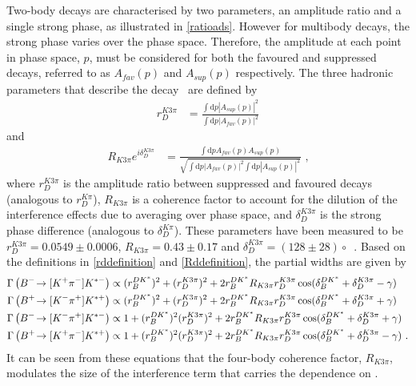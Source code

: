 Two-body \decay{\D}{\Kmp\pipm} decays are characterised by two parameters, an amplitude ratio and a single strong phase, as illustrated in \eqn\ref{ratioads}. However for multibody \decay{\D}{\Kmp\pipm\pimp\pipm} decays, the strong phase varies over the phase space. Therefore, the amplitude at each point in phase space, $p$, must be considered for both the \decay{\Dz}{\Km\pip\pim\pip} favoured and \decay{\Dz}{\Kp\pim\pip\pim} suppressed decays, referred to as $A_{fav}(p)$ and $A_{sup}(p)$ respectively. The three hadronic parameters that describe the \decay{\D}{\Km\pip\pim\pip} decay~\cite{charmk3pi,charmk3pi_errata,LHCb-PAPER-2015-057} are defined by
\begin{align}
r_D^{K3\pi} &= \frac{\int \mathrm{d}p \left|A_{sup}(p)\right|^2}{\int \mathrm{d}p \left|A_{fav}(p)\right|^2}
\label{rddefinition}
\end{align}
and
\begin{align}
R_{K3\pi} e^{i\delta_D^{K3\pi}} &= \frac{\int \mathrm{d}p A_{fav}(p)A_{sup}(p)}{\sqrt{\int \mathrm{d}p \left|A_{fav}(p)\right|^2 \int \mathrm{d}p \left|A_{sup}(p)\right|^2}} \text { ,}
\label{Rddefinition}
\end{align}
where $r_D^{K3\pi}$ is the amplitude ratio between suppressed and favoured \decay{\D}{\Km\pip\pim\pip} decays (analogous to $r_D^{K\pi}$), $R_{K3\pi}$ is a coherence factor to account for the dilution of the interference effects due to averaging over phase space, and $\delta_D^{K3\pi}$ is the strong phase difference (analogous to $\delta_D^{K\pi}$). These parameters have been measured to be $r_D^{K3\pi} = 0.0549 \pm 0.0006$, $R_{K3\pi} = 0.43 \pm 0.17$ and $\delta_D^{K3\pi} = \left(128 \pm 28\right){\circ}$~\cite{charmk3pi,charmk3pi_errata,LHCb-PAPER-2015-057}. Based on the definitions in \eqns\ref{rddefinition} and \ref{Rddefinition}, the partial widths are given by
\begin{align}
\Gamma\left({{{B}^-}}\!\rightarrow [{{K}^+}{{\pi}^-}]{\ensuremath{{K}^{*-}}}\right) &\propto (r_B^{DK^*})^2 + (r_D^{K3\pi})^2 + 2r_B^{DK^*}R_{K3\pi}r_D^{K3\pi}\cos(\delta_B^{DK^*} + \delta_D^{K3\pi} - \gamma) \label{adsBdecaym4body} \\
\Gamma\left({{{B}^+}}\!\rightarrow [{{K}^-}{{\pi}^+}]{\ensuremath{{K}^{*+}}}\right) &\propto (r_B^{DK^*})^2 + (r_D^{K3\pi})^2 + 2r_B^{DK^*}R_{K3\pi}r_D^{K3\pi}\cos(\delta_B^{DK^*} + \delta_D^{K3\pi} + \gamma) \label{adsBdecayp4body} \\
\Gamma\left({{{B}^-}}\!\rightarrow [{{K}^-}{{\pi}^+}]{\ensuremath{{K}^{*-}}}\right) &\propto 1 + (r_B^{DK^*})^2(r_D^{K3\pi})^2 + 2r_B^{DK^*}R_{K3\pi}r_D^{K3\pi}\cos(\delta_B^{DK^*} + \delta_D^{K3\pi} + \gamma) \label{favBdecaym4body} \\
\Gamma\left({{{B}^+}}\!\rightarrow [{{K}^+}{{\pi}^-}]{\ensuremath{{K}^{*+}}}\right) &\propto 1 + (r_B^{DK^*})^2(r_D^{K3\pi})^2 + 2r_B^{DK^*}R_{K3\pi}r_D^{K3\pi}\cos(\delta_B^{DK^*} + \delta_D^{K3\pi} - \gamma) \text{ .}\label{favBdecayp4body} 
\end{align}
It can be seen from these equations that the four-body coherence factor, $R_{K3\pi}$, modulates the size of the interference term that carries the dependence on \Pgamma.

